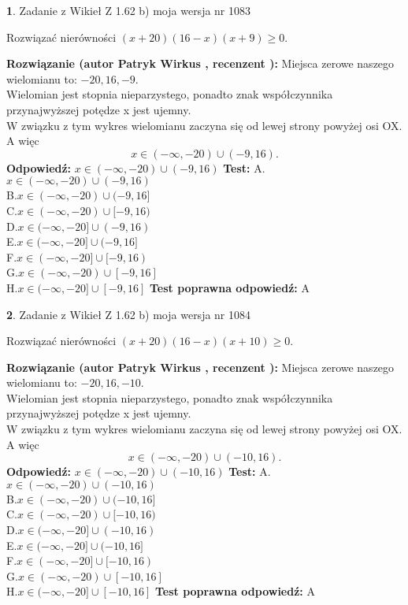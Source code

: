 \documentclass[12pt, a4paper]{article}
\theoremstyle{definition} %
\newtheorem{zad}{}
\newcommand{\zadStart}[1]{\begin{zad}#1\newline}
\newcommand{\zadStop}{\end{zad}}
\newcommand{\rozwStart}[2]{\noindent \textbf{Rozwiązanie (autor #1 , recenzent #2): }\newline}
\newcommand{\rozwStop}{\newline}
\newcommand{\odpStart}{\noindent \textbf{Odpowiedź:}\newline}
\newcommand{\odpStop}{\newline}
\newcommand{\testStart}{\noindent \textbf{Test:}\newline}
\newcommand{\testStop}{\newline}
\newcommand{\kluczStart}{\noindent \textbf{Test poprawna odpowiedź:}\newline}
\newcommand{\kluczStop}{\newline}
\begin{document}
\zadStart{Zadanie z Wikieł Z 1.62 b) moja wersja nr 1083}

Rozwiązać nierówności $(x+20)(16-x)(x+9)\ge0$.
\zadStop
\rozwStart{Patryk Wirkus}{}
Miejsca zerowe naszego wielomianu to: $-20, 16, -9$.\\
Wielomian jest stopnia nieparzystego, ponadto znak współczynnika przy\linebreak najwyższej potędze x jest ujemny.\\ W związku z tym wykres wielomianu zaczyna się od lewej strony powyżej osi OX. A więc $$x \in (-\infty,-20) \cup (-9,16).$$
\rozwStop
\odpStart
$x \in (-\infty,-20) \cup (-9,16)$
\odpStop
\testStart
A.$x \in (-\infty,-20) \cup (-9,16)$\\
B.$x \in (-\infty,-20) \cup (-9,16]$\\
C.$x \in (-\infty,-20) \cup [-9,16)$\\
D.$x \in (-\infty,-20] \cup (-9,16)$\\
E.$x \in (-\infty,-20] \cup (-9,16]$\\
F.$x \in (-\infty,-20] \cup [-9,16)$\\
G.$x \in (-\infty,-20) \cup [-9,16]$\\
H.$x \in (-\infty,-20] \cup [-9,16]$
\testStop
\kluczStart
A
\kluczStop



\zadStart{Zadanie z Wikieł Z 1.62 b) moja wersja nr 1084}

Rozwiązać nierówności $(x+20)(16-x)(x+10)\ge0$.
\zadStop
\rozwStart{Patryk Wirkus}{}
Miejsca zerowe naszego wielomianu to: $-20, 16, -10$.\\
Wielomian jest stopnia nieparzystego, ponadto znak współczynnika przy\linebreak najwyższej potędze x jest ujemny.\\ W związku z tym wykres wielomianu zaczyna się od lewej strony powyżej osi OX. A więc $$x \in (-\infty,-20) \cup (-10,16).$$
\rozwStop
\odpStart
$x \in (-\infty,-20) \cup (-10,16)$
\odpStop
\testStart
A.$x \in (-\infty,-20) \cup (-10,16)$\\
B.$x \in (-\infty,-20) \cup (-10,16]$\\
C.$x \in (-\infty,-20) \cup [-10,16)$\\
D.$x \in (-\infty,-20] \cup (-10,16)$\\
E.$x \in (-\infty,-20] \cup (-10,16]$\\
F.$x \in (-\infty,-20] \cup [-10,16)$\\
G.$x \in (-\infty,-20) \cup [-10,16]$\\
H.$x \in (-\infty,-20] \cup [-10,16]$
\testStop
\kluczStart
A
\kluczStop
\end{document}
